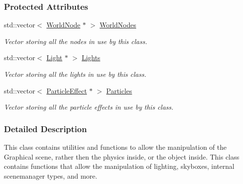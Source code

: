 \subsubsection*{Protected Attributes}
\begin{DoxyCompactItemize}
\item 
\hypertarget{classphys_1_1SceneManager_a51a391281cc074801792599ae38638b0}{
std::vector$<$ \hyperlink{classphys_1_1WorldNode}{WorldNode} $\ast$ $>$ \hyperlink{classphys_1_1SceneManager_a51a391281cc074801792599ae38638b0}{WorldNodes}}
\label{dd/da8/classphys_1_1SceneManager_a51a391281cc074801792599ae38638b0}

\begin{DoxyCompactList}\small\item\em Vector storing all the nodes in use by this class. \item\end{DoxyCompactList}\item 
\hypertarget{classphys_1_1SceneManager_a196c70361e8db0d5861cfb7b35f1bbf3}{
std::vector$<$ \hyperlink{classphys_1_1Light}{Light} $\ast$ $>$ \hyperlink{classphys_1_1SceneManager_a196c70361e8db0d5861cfb7b35f1bbf3}{Lights}}
\label{dd/da8/classphys_1_1SceneManager_a196c70361e8db0d5861cfb7b35f1bbf3}

\begin{DoxyCompactList}\small\item\em Vector storing all the lights in use by this class. \item\end{DoxyCompactList}\item 
\hypertarget{classphys_1_1SceneManager_a45f2d2029642d668c1e15a914eac7d1b}{
std::vector$<$ \hyperlink{classphys_1_1ParticleEffect}{ParticleEffect} $\ast$ $>$ \hyperlink{classphys_1_1SceneManager_a45f2d2029642d668c1e15a914eac7d1b}{Particles}}
\label{dd/da8/classphys_1_1SceneManager_a45f2d2029642d668c1e15a914eac7d1b}

\begin{DoxyCompactList}\small\item\em Vector storing all the particle effects in use by this class. \item\end{DoxyCompactList}\end{DoxyCompactItemize}


\subsubsection{Detailed Description}
This class contains utilities and functions to allow the manipulation of the Graphical scene, rather then the physics inside, or the object inside. This class contains functions that allow the manipulation of lighting, skyboxes, internal scenemanager types, and more. 

